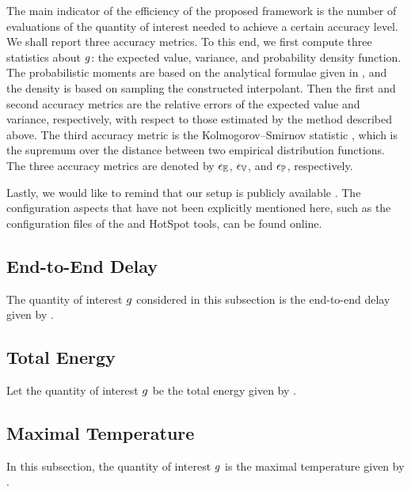 The main indicator of the efficiency of the proposed framework is the number of
evaluations of the quantity of interest needed to achieve a certain accuracy
level. We shall report three accuracy metrics. To this end, we first compute
three statistics about $g$: the expected value, variance, and probability
density function. The probabilistic moments are based on the analytical formulae
given in , and the density is based on sampling the
constructed interpolant. Then the first and second accuracy metrics are the
relative errors of the expected value and variance, respectively, with respect
to those estimated by the  method described above. The third accuracy
metric is the Kolmogorov--Smirnov statistic \cite{rao2009}, which is the
supremum over the distance between two empirical distribution functions. The
three accuracy metrics are denoted by $\epsilon_\mathbb{E}$, $\epsilon_\mathbb{V}$, and $\epsilon_\mathbb{P}$,
respectively.

Lastly, we would like to remind that our setup is publicly available
\cite{sources}. The configuration aspects that have not been explicitly
mentioned here, such as the configuration files of the  and HotSpot
tools, can be found online.

\subsection{End-to-End Delay}

The quantity of interest $g$ considered in this subsection is the end-to-end
delay given by .

\subsection{Total Energy}

Let the quantity of interest $g$ be the total energy given by
.

\subsection{Maximal Temperature}

In this subsection, the quantity of interest $g$ is the maximal temperature
given by .
